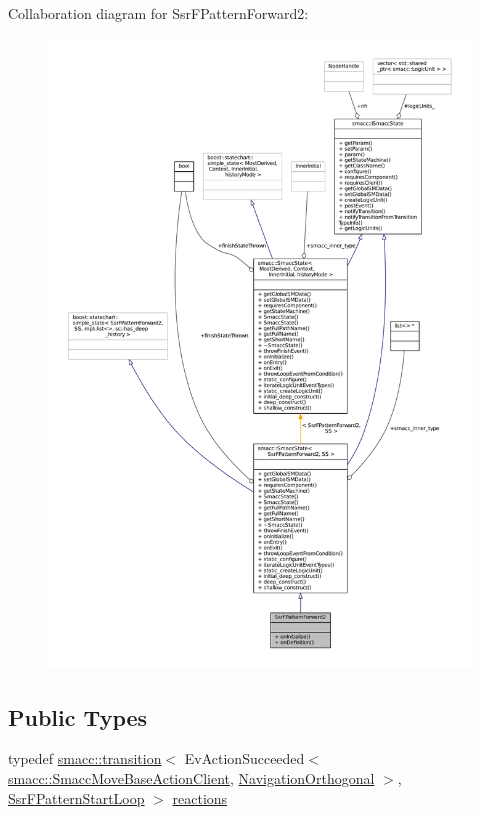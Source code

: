 Collaboration diagram for Ssr\+F\+Pattern\+Forward2\+:
\nopagebreak
\begin{figure}[H]
\begin{center}
\leavevmode
\includegraphics[width=350pt]{structSsrFPatternForward2__coll__graph}
\end{center}
\end{figure}
\subsection*{Public Types}
\begin{DoxyCompactItemize}
\item 
typedef \hyperlink{classsmacc_1_1transition}{smacc\+::transition}$<$ Ev\+Action\+Succeeded$<$ \hyperlink{classsmacc_1_1SmaccMoveBaseActionClient}{smacc\+::\+Smacc\+Move\+Base\+Action\+Client}, \hyperlink{classNavigationOrthogonal}{Navigation\+Orthogonal} $>$, \hyperlink{structSsrFPatternStartLoop}{Ssr\+F\+Pattern\+Start\+Loop} $>$ \hyperlink{structSsrFPatternForward2_ac0a963e017b7e9b15e6dd7c1b063d453}{reactions}
\end{DoxyCompactItemize}
